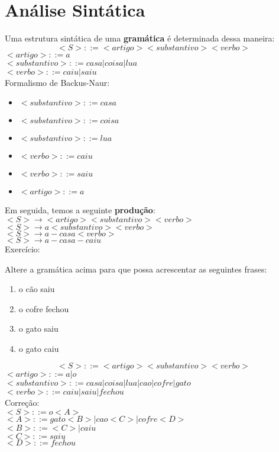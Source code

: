 \documentclass[]{article}
\begin{document}
	\section{Análise Sintática}
	Uma estrutura sintática de uma \textbf{gramática} é determinada dessa maneira:
	$$<S> ::= <artigo><substantivo><verbo>$$
	$<artigo> ::= a$\\
	$<substantivo> ::= casa | coisa | lua$\\
	$<verbo> ::= caiu | saiu$\\
	
	Formalismo de Backus-Naur:
	\begin{itemize}
		\item $<substantivo> ::= casa$
		\item $<substantivo> ::= coisa$
		\item $<substantivo> ::= lua$
		\item $<verbo> ::= caiu$
		\item $<verbo> ::= saiu$
		\item $<artigo> ::= a$
	\end{itemize}
	Em seguida, temos a seguinte \textbf{produção}:\\
	$<S> \to <artigo><substantivo><verbo>$\\
	$<S>\to a <substantivo> <verbo>$\\
	$<S> \to a - casa<verbo>$\\
	$<S> \to a - casa- caiu$\\
	
	\newpage
	Exercício: 

	Altere a gramática acima para que possa acrescentar as seguintes frases:
	\begin{enumerate}
		\item o cão saiu
		\item o cofre fechou
		\item o gato saiu
		\item o gato caiu
	\end{enumerate}
	
		$$<S> ::= <artigo><substantivo><verbo>$$
	$<artigo> ::= a | o$\\
	$<substantivo> ::= casa | coisa | lua | cao | cofre | gato $\\
	$<verbo> ::= caiu | saiu | fechou$\\
	
	Correção:\\
	$ <S> ::= o<A>$\\
	$<A> ::= gato<B> | cao <C> | cofre <D>$\\
	$<B> ::= <C> | caiu$\\
	$<C> ::= saiu$\\
	$<D> ::= fechou$\\
	
\end{document}
